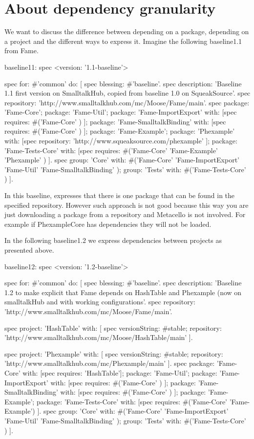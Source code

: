 \documentclass[a4paper,10pt,twoside]{book}
\begin{document}
\section{About dependency granularity}
We want to discuss the difference between depending on a package, depending on a project and the different ways to express it.
Imagine the following baseline1.1 from Fame.

\begin{code}{}
baseline11: spec
	<version: '1.1-baseline'>

	spec for: #'common' do: [
		spec blessing: #'baseline'.
		spec description: 'Baseline 1.1 first version on SmalltalkHub, copied from baseline 1.0 on SqueakSource'.
		spec repository: 'http://www.smalltalkhub.com/mc/Moose/Fame/main'.
		spec
			package: 'Fame-Core';
			package: 'Fame-Util';
			package: 'Fame-ImportExport' with: [spec requires: #('Fame-Core' ) ];
			package: 'Fame-SmalltalkBinding' with: [spec requires: #('Fame-Core' ) ];
			package: 'Fame-Example';
			package: 'Phexample' with: [spec repository: 'http://www.squeaksource.com/phexample' ];
			package: 'Fame-Tests-Core' with: [spec requires: #('Fame-Core' 'Fame-Example' 'Phexample' ) ].
		spec
			group: 'Core' with: #('Fame-Core' 'Fame-ImportExport' 'Fame-Util' 'Fame-SmalltalkBinding' );
			group: 'Tests' with: #('Fame-Tests-Core' ) ].
\end{code}

In this baseline, 
expresses that there is one package that can be found in the specified repository.
However such approach is not good because this way you are just downloading a package from a repository and Metacello is not involved. For example if PhexampleCore has dependencies they will not be loaded.

In the following baseline1.2 we express dependencies between projects as presented above.
\begin{code}{}
baseline12: spec
	<version: '1.2-baseline'>

	spec for: #'common' do: [
		spec blessing: #'baseline'.
		spec description: 'Baseline 1.2 to make explicit that Fame depends on HashTable and Phexample (now on smalltalkHub and with working configurations'.
		spec repository: 'http://www.smalltalkhub.com/mc/Moose/Fame/main'.

		spec project: 'HashTable' with: [
				spec
					versionString: #stable;
					repository: 'http://www.smalltalkhub.com/mc/Moose/HashTable/main' ].

		spec project: 'Phexample' with: [
				spec
					versionString: #stable;
					repository: 'http://www.smalltalkhub.com/mc/Phexample/main' ].
		spec
			package: 'Fame-Core' with: [spec requires: 'HashTable'];
			package: 'Fame-Util';
			package: 'Fame-ImportExport' with: [spec requires: #('Fame-Core' ) ];
			package: 'Fame-SmalltalkBinding' with: [spec requires: #('Fame-Core' ) ];
			package: 'Fame-Example';
			package: 'Fame-Tests-Core' with: [spec requires: #('Fame-Core' 'Fame-Example') ].
		spec
			group: 'Core' with: #('Fame-Core' 'Fame-ImportExport' 'Fame-Util' 'Fame-SmalltalkBinding' );
			group: 'Tests' with: #('Fame-Tests-Core' ) ].
\end{code}
\end{document}
